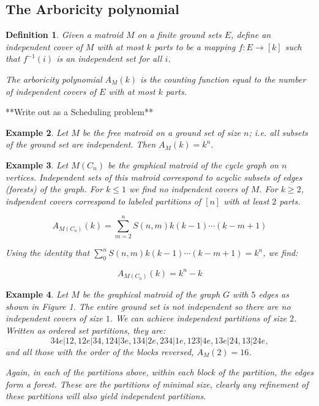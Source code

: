 \documentclass[12pt]{amsart}
\newtheorem{definition}{Definition}
\newtheorem{example}[definition]{Example}
\begin{document}
\subsection{The Arboricity polynomial}

\begin{definition} Given a matroid $M$ on a finite ground sets $E$, define an independent cover of $M$ with at most $k$ parts to be a mapping $f : E \rightarrow [k]$ such that $f^{-1}(i)$ is an independent set for all $i$.  

  The arboricity polynomial $A_M(k)$ is the counting function equal to the number of independent covers of $E$ with at most $k$ parts.
\end{definition}

**Write out as a  Scheduling problem**

\begin{example}

Let $M$ be the free matroid on a ground set of size $n$; i.e. all subsets of the ground set are independent.  Then $A_M(k) = k^n$.  

\end{example}

\begin{example}

Let $M(C_n)$ be the graphical matroid of the cycle graph on $n$
vertices.  Independent sets of this matroid correspond to acyclic
subsets of edges (forests) of the graph.  For $k \leq 1$ we find no
indpendent covers of $M$.  For $k \geq 2$, indpendent covers
correspond to labeled partitions of $[n]$ with at least $2$ parts.

$$A_{M(C_n)}(k) = \sum_{m=2}^{n} S(n,m) k(k-1) \cdots (k-m+1) $$

Using the identity that $\sum_0^n S(n,m) k(k-1) \cdots (k-m+1) = k^n$, we find:

$$A_{M(C_n)}(k) = k^n - k $$

\end{example}



\begin{example}
Let $M$ be the graphical matroid of the graph $G$ with $5$ edges as
shown in Figure 1.  The entire ground set is not independent so there
are no independent covers of size $1$.  We can achieve independent
partitions of size $2$.  Written as ordered set partitions, they are:
$$ 34e|12, 12e|34, 124|3e, 134|2e, 234|1e, 123|4e, 13e|24, 13|24e, $$
and all those with the order of the blocks reversed, $A_M(2) = 16$.  

Again, in each of the partitions above, within each block of the
partition, the edges form a forest.  These are the partitions of
minimal size, clearly any refinement of these partitions will also
yield independent partitions.

\end{example}
\end{document}
